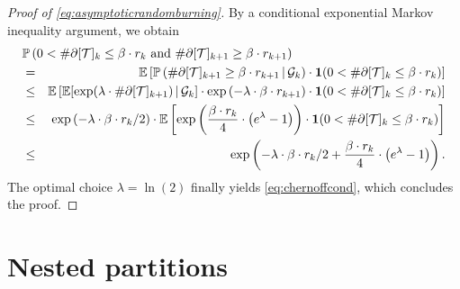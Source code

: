 \documentclass[a4paper,11pt]{article}
\begin{document}
\begin{proof}[Proof of \eqref{eq:asymptoticrandomburning}]
By a conditional exponential Markov inequality argument, we obtain
\begin{eqnarray*}
\lefteqn{\mathbb{P}\left(\text{$0<\#\partial[\mathcal{T}]_k\leq\beta\cdot r_k$ and $\#\partial[\mathcal{T}]_{k+1}\geq\beta\cdot r_{k+1}$}\right)}\\
&=&\mathbb{E}\left[\mathbb{P}\left(\#\partial[\mathcal{T}]_{k+1}\geq\beta\cdot r_{k+1}\,|\,\mathcal{G}_k\right)\cdot\mathbf{1}(0<\#\partial[\mathcal{T}]_k\leq\beta\cdot r_k)\right]\\
&\leq&\mathbb{E}\left[\mathbb{E}[\exp(\lambda\cdot\#\partial[\mathcal{T}]_{k+1})\,|\,\mathcal{G}_k]\cdot\exp\left(-\lambda\cdot\beta\cdot r_{k+1}\right)\cdot\mathbf{1}(0<\#\partial[\mathcal{T}]_k\leq\beta\cdot r_k)\right]\\
&\leq&\exp\left(-\lambda\cdot\beta\cdot r_k/2\right)\cdot\mathbb{E}\left[\exp\left(\frac{\beta\cdot r_k}{4}\cdot\left(e^\lambda-1\right)\right)\cdot\mathbf{1}(0<\#\partial[\mathcal{T}]_k\leq\beta\cdot r_k)\right]\\
&\leq&\exp\left(-\lambda\cdot\beta\cdot r_k/2+\frac{\beta\cdot r_k}{4}\cdot\left(e^\lambda-1\right)\right).
\end{eqnarray*}
The optimal choice $\lambda=\ln(2)$ finally yields \eqref{eq:chernoffcond}, which concludes the proof.
\end{proof}




\appendix

\section{Nested partitions}\label{sec:appendix}
\end{document}
